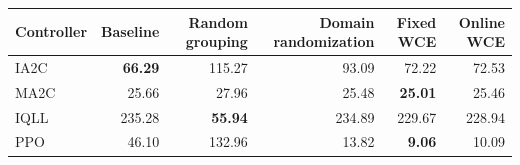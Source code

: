 \begin{tabular}{lrrrrr}
\hline
Controller & Baseline & Random grouping & Domain randomization & Fixed WCE & Online WCE \\
\hline
IA2C & \textbf{66.29} & 115.27 & 93.09 & 72.22 & 72.53 \\
MA2C & 25.66 & 27.96 & 25.48 & \textbf{25.01} & 25.46 \\
IQLL & 235.28 & \textbf{55.94} & 234.89 & 229.67 & 228.94 \\
PPO & 46.10 & 132.96 & 13.82 & \textbf{9.06} & 10.09 \\
\hline
\end{tabular}
